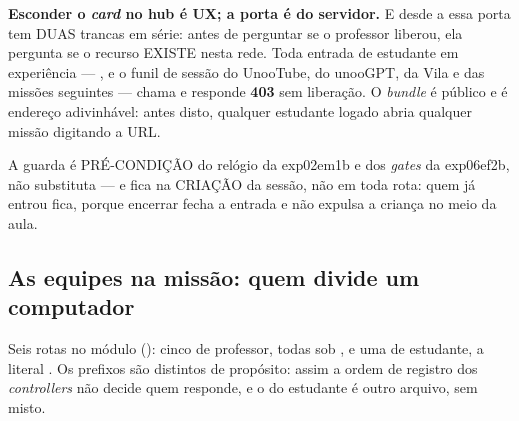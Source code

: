 \begin{regra}
\textbf{Esconder o \emph{card} no hub é UX; a porta é do servidor.} E desde a
 essa porta tem DUAS trancas em série: antes de perguntar se o
professor liberou, ela pergunta se o recurso EXISTE nesta rede. Toda entrada
de estudante em experiência --- ,  e o funil
de sessão do UnooTube, do unooGPT, da Vila e das missões seguintes --- chama
 e responde \textbf{403}  sem
liberação. O \emph{bundle} é público e  é endereço adivinhável:
antes disto, qualquer estudante logado abria qualquer missão digitando a URL.

A guarda é PRÉ-CONDIÇÃO do relógio da exp02em1b e dos \emph{gates} da exp06ef2b, não
substituta --- e fica na CRIAÇÃO da sessão, não em toda rota: quem já entrou
fica, porque encerrar fecha a entrada e não expulsa a criança no meio da aula.
\end{regra}

\subsection{As equipes na missão: quem divide um computador}

Seis rotas no módulo  (): cinco de professor, todas
sob , e uma de estudante, a literal
. Os prefixos são distintos de propósito: assim a ordem de
registro dos \emph{controllers} não decide quem responde, e o do estudante é
outro arquivo, sem  misto.

